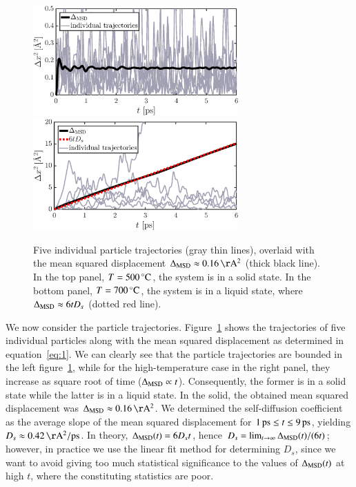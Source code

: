 \begin{figure}[!ht]
\begin{center}
  \includegraphics[width=0.7\textwidth]{../figures/MSD-500}  \\
    \includegraphics[width=0.7\textwidth]{../figures/MSD-700} 
  \caption{Five individual particle trajectories (gray thin lines), overlaid with the mean squared displacement $\Delta_{\rm MSD} \approx \unit[0.16]{\AA^2}$ (thick black line). In the top panel, $T=\unit[500]{^\circ C}$, the system is in a solid state. In the bottom panel, $T=\unit[700]{^\circ C}$, the system is in a liquid state, where $\Delta_{\rm MSD} \approx 6 t D_s$ (dotted red line).}
  \label{fig:MSD}
\end{center}
\end{figure}
We now consider the particle trajectories. Figure~\ref{fig:MSD} shows the trajectories of five individual particles along with the mean squared displacement as determined in equation~\eqref{eq:1}. We can clearly see that the particle trajectories are bounded in the left figure~\ref{fig:MSD}, while for the high-temperature case in the right panel, they increase as square root of time ($\Delta_{\rm MSD} \propto t$). Consequently, the former is in a solid state while the latter is in a liquid state.  
In the solid, the obtained mean squared displacement was $\Delta_{\rm MSD} \approx \unit[0.16]{\AA^2}$. We determined the self-diffusion coefficient as the average slope of the mean squared displacement for $\unit[1]{ps} \leq t \leq \unit[9]{ps}$, yielding $D_s \approx \unit[0.42]{\AA^2/ps}$. In theory, $\Delta_{\rm MSD}(t)=6D_st$, hence $D_s=\lim_{t\to\infty}\Delta_{\rm MSD}(t)/(6t)$; however, in practice we use the linear fit method for determining $D_s$, since we want to avoid giving too much statistical significance to the values of $\Delta_{\rm MSD}(t)$ at high $t$, where the constituting statistics are poor.



